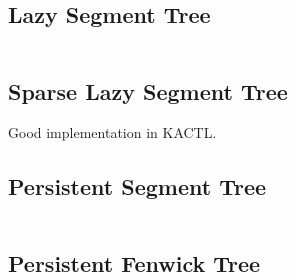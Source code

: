 \hrulefill \vspace{-\baselineskip}
\begin{multicols}{2}
\inputminted[autogobble,fontsize=\tiny]{C++}{Data Structures/segment_tree.cpp}
\end{multicols}
\vspace{-\baselineskip}
\noindent \hrulefill

\subsection{Lazy Segment Tree}

\hrulefill \vspace{-\baselineskip}
\begin{multicols}{2}
\inputminted[autogobble,fontsize=\tiny]{C++}{Data Structures/lazy_segment_tree.cpp}
\end{multicols}
\vspace{-\baselineskip}
\noindent \hrulefill

\subsection{Sparse Lazy Segment Tree}

Good implementation in KACTL.

\subsection{Persistent Segment Tree}

\hrulefill \vspace{-\baselineskip}
\begin{multicols}{2}
\inputminted[autogobble,fontsize=\tiny]{C++}{Data Structures/persistant_segtree.cpp}
\end{multicols}
\vspace{-\baselineskip}
\noindent \hrulefill

\subsection{Persistent Fenwick Tree}

